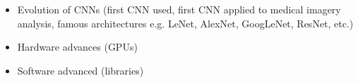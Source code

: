 \documentclass[letterpaper,12pt]{article}
\begin{document}
\begin{itemize}
    \item Evolution of CNNs (first CNN used, first CNN applied to medical imagery analysis, famous architectures e.g. LeNet, AlexNet, GoogLeNet, ResNet, etc.)
    \item Hardware advances (GPUs)
    \item Software advanced (libraries)
\end{itemize}



\begin{appendices}

\clearpage



\end{appendices}
\end{document}
